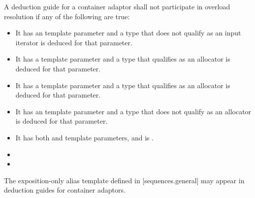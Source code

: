 \pnum
A deduction guide for a container adaptor shall not participate in overload resolution if any of the following are true:
\begin{itemize}
\item It has an  template parameter and a type that does not qualify as an input iterator is deduced for that parameter.
\item It has a  template parameter and a type that qualifies as an allocator is deduced for that parameter.
\item It has a  template parameter and a type that qualifies as an allocator is deduced for that parameter.
\item It has an  template parameter and a type that does not qualify as an allocator is deduced for that parameter.
\item It has both  and  template parameters, and  is .
\item {}
\item {}
\end{itemize}

\pnum
The exposition-only alias template  defined in
[sequences.general] may appear in
deduction guides for container adaptors.

\noindent\makebox[\linewidth]{\rule{\textwidth}{0.4pt}}

